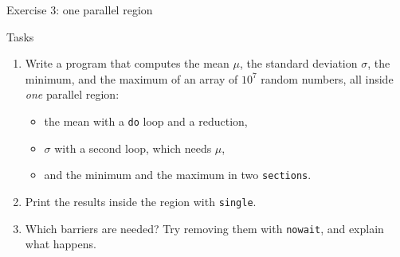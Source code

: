 \begin{frame}{Exercise 3: one parallel region}
  \begin{block}{Tasks}
    \begin{enumerate}
      \item Write a program that computes the mean $\mu$, the standard deviation $\sigma$, the minimum, and the maximum of an array of $10^7$ random numbers, all inside \emph{one} parallel region:
        \begin{itemize}
          \item the mean with a \texttt{do} loop and a reduction,
          \item $\sigma$ with a second loop, which needs $\mu$,
          \item and the minimum and the maximum in two \texttt{sections}.
        \end{itemize}
      \item Print the results inside the region with \texttt{single}.
      \item Which barriers are needed? Try removing them with \texttt{nowait}, and explain what happens.
    \end{enumerate}
  \end{block}
\end{frame}


